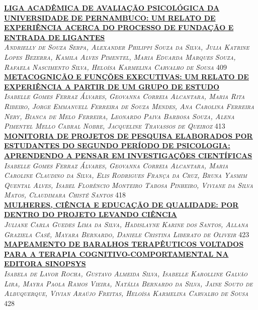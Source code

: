 \noindent \textsc{\hyperlink{trabalhos/251793.pdf.1}{\textbf{LIGA ACADÊMICA DE AVALIAÇÃO PSICOLÓGICA DA UNIVERSIDADE DE PERNAMBUCO: UM RELATO DE EXPERIÊNCIA ACERCA DO PROCESSO DE FUNDAÇÃO E ENTRADA DE LIGANTES}}}\\ 
\noindent \textsc{\textit{Andrielly de Souza Serpa, Alexander Philippi Souza da Silva, Julia Katrine Lopes Bezerra, Kamila Alves Pimentel, Maria Eduarda Marques Souza, Rafaela Nascimento Silva, Heloísa Karmelina Carvalho de Sousa}} \hfill 409\\ 

\noindent \textsc{\hyperlink{trabalhos/251204.pdf.1}{\textbf{METACOGNIÇÃO E FUNÇÕES EXECUTIVAS: UM RELATO DE EXPERIÊNCIA A PARTIR DE UM GRUPO DE ESTUDO}}}\\ 
\noindent \textsc{\textit{Isabelle Gomes Ferraz Álvares, Geovanna Correia Alcantara, Maria Rita Ribeiro, Jorge Emmanuell Ferreira de Souza Mendes, Ana Carolina Ferreira Nery, Bianca de Melo Ferreira, Leonardo Paiva Barbosa Souza, Alena Pimentel Mello Cabral Nobre, Jacqueline Travassos de Queiroz}} \hfill 413\\ 

\noindent \textsc{\hyperlink{trabalhos/251200.pdf.1}{\textbf{MONITORIA DE PROJETOS DE PESQUISA ELABORADOS POR ESTUDANTES DO SEGUNDO PERÍODO DE PSICOLOGIA: APRENDENDO A PENSAR EM INVESTIGAÇÕES CIENTÍFICAS}}}\\ 
\noindent \textsc{\textit{Isabelle Gomes Ferraz Álvares, Geovanna Correia Alcantara, Maria Caroline Claudino da Silva, Elis Rodrigues França da Cruz, Bruna Yasmim Quental Alves, Isabel Florêncio Monteiro Tabosa Pinheiro, Viviane da Silva Matos, Claudimara Chisté Santos}} \hfill 418\\ 

\noindent \textsc{\hyperlink{trabalhos/251909.pdf.1}{\textbf{MULHERES, CIÊNCIA E EDUCAÇÃO DE QUALIDADE: POR DENTRO DO PROJETO LEVANDO CIÊNCIA}}}\\ 
\noindent \textsc{\textit{Juliane Carla Guedes Lima da Silva, Hadislayne Karine dos Santos, Allana Graziela Casé, Mayara Bernardo, Daniele Cristina Liberato de Oliveir}} \hfill 423\\ 

\noindent \textsc{\hyperlink{trabalhos/249030.pdf.1}{\textbf{MAPEAMENTO DE BARALHOS TERAPÊUTICOS VOLTADOS PARA A TERAPIA COGNITIVO-COMPORTAMENTAL NA EDITORA SINOPSYS}}}\\ 
\noindent \textsc{\textit{Isabela de Lavor Rocha, Gustavo Almeida Silva, Isabelle Karolline Galvão Lira, Mayra Paola Ramos Vieira, Natália Bernardo da Silva, Jaine Souto de Albuquerque, Vivian Araújo Freitas, Heloísa Karmelina Carvalho de Sousa}} \hfill 428\\ 

